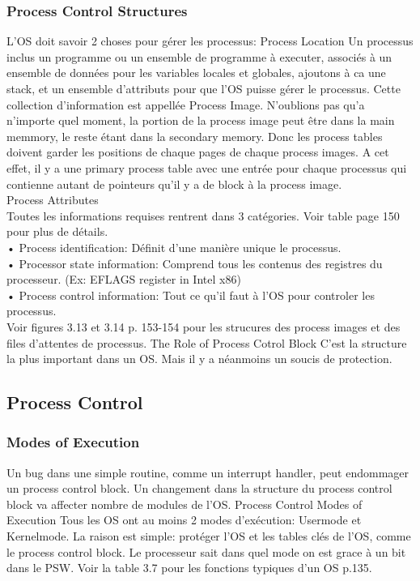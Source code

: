 \subsubsection{Process Control Structures}
L’OS doit savoir 2 choses pour gérer les processus:
Process Location
Un processus inclus un programme ou un ensemble de programme à executer, associés à un ensemble de données pour les variables locales et globales, ajoutons à ca une stack, et un ensemble d’attributs pour que l’OS puisse gérer le processus. Cette collection d’information est appellée Process Image.
N’oublions pas qu’a n’importe quel moment, la portion de la process image peut être dans la main memmory, le reste étant dans la secondary memory. Donc les process tables doivent garder les positions de chaque pages de chaque process images.
A cet effet, il y a une primary process table avec une entrée pour chaque processus qui contienne autant de pointeurs qu’il y a de block à la process image. \\
Process Attributes \\
Toutes les informations requises rentrent dans 3 catégories. Voir table page 150 pour plus de détails. \\
• Process identification: Définit d’une manière unique le processus. \\
• Processor state information: Comprend tous les contenus des registres du processeur. (Ex: EFLAGS register in Intel x86) \\
• Process control information: Tout ce qu’il faut à l’OS pour controler les processus. \\
Voir figures 3.13 et 3.14 p. 153-154 pour les strucures des process images et des files d’attentes de processus.
The Role of Process Cotrol Block
C’est la structure la plus important dans un OS. Mais il y a néanmoins un soucis de protection.
\subsection{Process Control}
\subsubsection{Modes of Execution}
Un bug dans une simple routine, comme un interrupt handler, peut endommager un process control block.
Un changement dans la structure du process control block va affecter nombre de modules de l’OS.
Process Control Modes of Execution
Tous les OS ont au moins 2 modes d’exécution: Usermode et Kernelmode. La raison est simple: protéger l’OS et les tables clés de l’OS, comme le process control block. Le processeur sait dans quel mode on est grace à un bit dans le PSW. Voir la table 3.7 pour les fonctions typiques d’un OS p.135.
